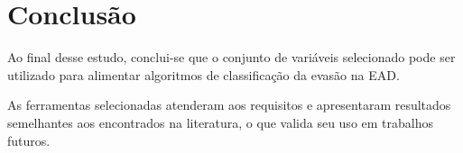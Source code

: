 \chapter{Conclusão}

Ao final desse estudo, conclui-se que o conjunto de variáveis selecionado pode
ser utilizado para alimentar algoritmos de classificação da evasão na EAD.

As ferramentas selecionadas atenderam aos requisitos e apresentaram resultados
semelhantes aos encontrados na literatura, o que valida seu uso em trabalhos
futuros.

